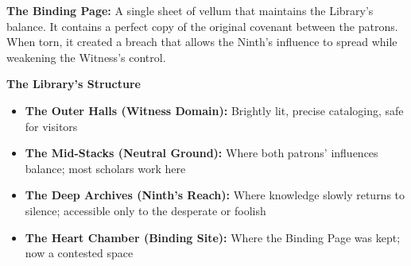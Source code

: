 \documentclass[10pt,letterpaper]{article}
\newcommand{\sectionheader}[1]{\vspace{0.5em}\textbf{\large #1}\\[0.3em]}
\begin{document}
\textbf{The Binding Page:} A single sheet of vellum that maintains the Library's balance. It contains a perfect copy of the original covenant between the patrons. When torn, it created a breach that allows the Ninth's influence to spread while weakening the Witness's control.

\sectionheader{The Library's Structure}

\begin{itemize}
    \item \textbf{The Outer Halls (Witness Domain):} Brightly lit, precise cataloging, safe for visitors
    \item \textbf{The Mid-Stacks (Neutral Ground):} Where both patrons' influences balance; most scholars work here
    \item \textbf{The Deep Archives (Ninth's Reach):} Where knowledge slowly returns to silence; accessible only to the desperate or foolish
    \item \textbf{The Heart Chamber (Binding Site):} Where the Binding Page was kept; now a contested space
\end{itemize}
\end{document}
